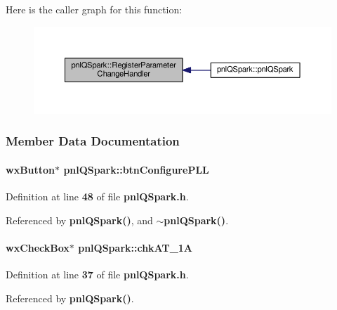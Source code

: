 Here is the caller graph for this function\+:
\nopagebreak
\begin{figure}[H]
\begin{center}
\leavevmode
\includegraphics[width=350pt]{d5/d92/classpnlQSpark_a9fed15521f17df0770bea81381a0def7_icgraph}
\end{center}
\end{figure}




\subsubsection{Member Data Documentation}
\paragraph[{btn\+Configure\+P\+LL}]{\setlength{\rightskip}{0pt plus 5cm}wx\+Button$\ast$ pnl\+Q\+Spark\+::btn\+Configure\+P\+LL}\label{classpnlQSpark_a37f5c2afa8eb71885d82cfe069308062}


Definition at line {\bf 48} of file {\bf pnl\+Q\+Spark.\+h}.



Referenced by {\bf pnl\+Q\+Spark()}, and {\bf $\sim$pnl\+Q\+Spark()}.

\paragraph[{chk\+A\+T\+\_\+1A}]{\setlength{\rightskip}{0pt plus 5cm}wx\+Check\+Box$\ast$ pnl\+Q\+Spark\+::chk\+A\+T\+\_\+1A}\label{classpnlQSpark_a7bdc5fce5677f074d875d9ad68c87dd2}


Definition at line {\bf 37} of file {\bf pnl\+Q\+Spark.\+h}.



Referenced by {\bf pnl\+Q\+Spark()}.

